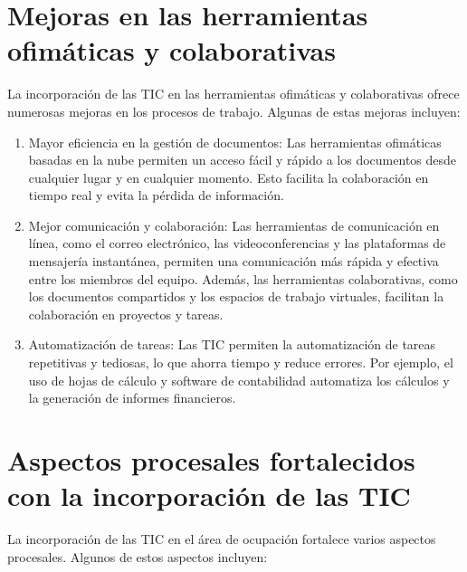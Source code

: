 \documentclass{article}
\theoremstyle{mytheoremstyle}
\theoremstyle{mytheoremstyle}
\theoremstyle{myproblemstyle}
\begin{document}
\section{Mejoras en las herramientas ofimáticas y colaborativas}

La incorporación de las TIC en las herramientas ofimáticas y colaborativas ofrece numerosas mejoras en los procesos de trabajo. Algunas de estas mejoras incluyen:

\begin{enumerate}
  \item Mayor eficiencia en la gestión de documentos: Las herramientas ofimáticas basadas en la nube permiten un acceso fácil y rápido a los documentos desde cualquier lugar y en cualquier momento. Esto facilita la colaboración en tiempo real y evita la pérdida de información.
  
  \item Mejor comunicación y colaboración: Las herramientas de comunicación en línea, como el correo electrónico, las videoconferencias y las plataformas de mensajería instantánea, permiten una comunicación más rápida y efectiva entre los miembros del equipo. Además, las herramientas colaborativas, como los documentos compartidos y los espacios de trabajo virtuales, facilitan la colaboración en proyectos y tareas.
  
  \item Automatización de tareas: Las TIC permiten la automatización de tareas repetitivas y tediosas, lo que ahorra tiempo y reduce errores. Por ejemplo, el uso de hojas de cálculo y software de contabilidad automatiza los cálculos y la generación de informes financieros.
\end{enumerate}

\section{Aspectos procesales fortalecidos con la incorporación de las TIC}

La incorporación de las TIC en el área de ocupación fortalece varios aspectos procesales. Algunos de estos aspectos incluyen:
\end{document}
